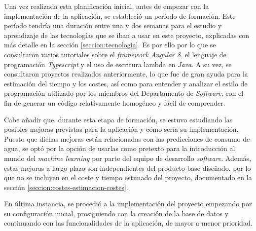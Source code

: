 \documentclass[pdftex,11pt,a4paper]{book}
\begin{document}
Una vez realizada esta planificación inicial, antes de empezar con la implementación de la aplicación, se estableció un período de formación. Este período tendría una duración entre una y dos semanas para el estudio y aprendizaje de las tecnologías que se iban a usar en este proyecto, explicadas con más detalle en la sección \ref{seccion:tecnologia}. Es por ello por lo que se consultaron varios tutoriales sobre el \textit{framework Angular 8}, el lenguaje de programación \textit{Typescript} y el uso de escritura lambda en \textit{Java}. A su vez, se consultaron proyectos realizados anteriormente, lo que fue de gran ayuda para la estimación del tiempo y los costes, así como para entender y analizar el estilo de programación utilizado por los miembros del Departamento de \textit{Software}, con el fin de generar un código relativamente homogéneo y fácil de comprender. 

Cabe añadir que, durante esta etapa de formación, se estuvo estudiando las posibles mejoras previstas para la aplicación y cómo sería su implementación. Puesto que dichas mejoras están relacionadas con las predicciones de consumo de agua, se optó por la opción de usarlas como pretexto para la introducción al mundo del \textit{machine learning} por parte del equipo de desarrollo \textit{software}. Además, estas mejoras a largo plazo son independientes del producto base diseñado, por lo que no se incluyen en el coste y tiempo estimado del proyecto, documentado en la sección \ref{seccion:costes-estimacion-costes}.

En última instancia, se procedió a la implementación del proyecto empezando por su configuración inicial, prosiguiendo con la creación de la base de datos y continuando con las funcionalidades de la aplicación, de mayor a menor prioridad.


\renewcommand{\tablename}{Tabla}

\renewcommand{\arraystretch}{1,7}
\end{document}
